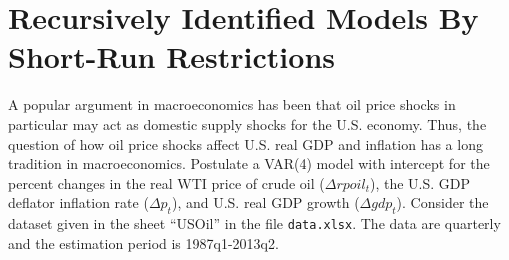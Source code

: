 \documentclass[a4paper]{scrartcl}
\begin{document}
\section{Recursively Identified Models By Short-Run Restrictions}
A popular argument in macroeconomics has been that oil price shocks in particular may act as domestic supply shocks for the U.S. economy. Thus, the question of how oil price shocks affect U.S. real GDP and inflation has a long tradition in macroeconomics. Postulate a VAR(4) model with intercept for the percent changes in the real WTI price of crude oil ($\Delta rpoil_t$), the U.S. GDP deflator inflation rate ($\Delta p_t$), and U.S. real GDP growth ($\Delta gdp_t$). Consider the dataset given in the sheet \enquote{USOil} in the file \texttt{data.xlsx}. The data are quarterly and the estimation period is 1987q1-2013q2. 
\end{document}
